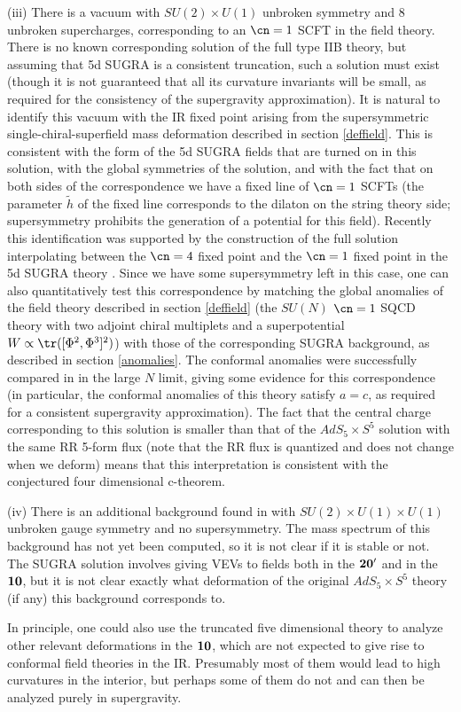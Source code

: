 \begin{itemize}
 (iii) There is \cite{Khavaev:1998fb,Karch:1999pv,Freedman:1999gp} a
 vacuum with $SU(2)\times U(1)$ unbroken symmetry and 8 unbroken
 supercharges, corresponding to an $\cn=1$ SCFT in the field
 theory. There is no known corresponding solution of the full type IIB
 theory, but assuming that 5d SUGRA is a consistent truncation, such a
 solution must exist (though it is not guaranteed that all its
 curvature invariants will be small, as required for the consistency
 of the supergravity approximation). It is natural to identify this
 vacuum with the IR fixed point arising from the supersymmetric
 single-chiral-superfield mass deformation described in section
 \ref{deffield}. This is consistent with the form of the 5d SUGRA
 fields that are turned on in this solution, with the global
 symmetries of the solution, and with the fact that on both sides of
 the correspondence we have a fixed line of $\cn=1$ SCFTs (the
 parameter $\tilde{h}$ of the fixed line corresponds to the dilaton on
 the string theory side; supersymmetry prohibits the generation of a
 potential for this field). Recently this identification was supported
 by the construction of the full solution interpolating between the
 $\cn=4$ fixed point and the $\cn=1$ fixed point in the 5d SUGRA theory
 \cite{Freedman:1999gp}. Since we have some supersymmetry left in
 this case, one can also quantitatively test this correspondence by
 matching the global anomalies of the field theory described in
 section \ref{deffield} (the $SU(N)$ $\cn=1$ SQCD theory with two
 adjoint chiral multiplets and a superpotential $W\propto
 \tr([\Phi^2,\Phi^3]^2)$) with those of the corresponding SUGRA
 background, as described in section \ref{anomalies}. The conformal
 anomalies were successfully compared in
 \cite{Karch:1999pv,Freedman:1999gp} in the
 large $N$ limit, giving some evidence for this correspondence (in
 particular, the conformal anomalies of this theory satisfy $a=c$, as
 required for a consistent supergravity approximation). The fact that
 the central charge corresponding to this solution is smaller than
 that of the $AdS_5\times S^5$ solution with the same RR 5-form flux
 (note that the RR flux is quantized and does not change when we
 deform) means that this interpretation is consistent with the
 conjectured four dimensional c-theorem.

 (iv) There is an additional background found in \cite{Khavaev:1998fb}
 with $SU(2)\times U(1)\times U(1)$ unbroken gauge symmetry and no
 supersymmetry. The mass spectrum of this background has not yet been
 computed, so it is not clear if it is stable or not. The SUGRA
 solution involves giving VEVs to fields both in the $\bf 20'$ and in
 the $\bf 10$, but it is not clear exactly what deformation of the
 original $AdS_5\times S^5$ theory (if any) this background
 corresponds to.

In principle, one could also use the truncated five dimensional theory
to analyze other relevant deformations in the $\bf 10$, which are not
expected to give rise to conformal field theories in the
IR. Presumably most of them would lead to high curvatures in the
interior, but perhaps some of them do not and can then be analyzed
purely in supergravity.

\end{itemize}

